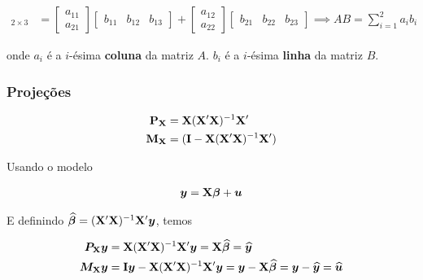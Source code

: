 \documentclass[11pt, oneside, a4paper, article]{article}
\numberwithin{equation}{section}
\begin{document}
\begin{description}
\begin{align*}
	[AB]_{2 \times 3} &=
	\begin{bmatrix}
		a_{11} \\ a_{21}
	\end{bmatrix}
	\begin{bmatrix}
		b_{11} & b_{12} & b_{13}
	\end{bmatrix}
	+
	\begin{bmatrix}
		a_{12} \\ a_{22}
	\end{bmatrix}
	\begin{bmatrix}
		b_{21} & b_{22} & b_{23}
	\end{bmatrix}
	\implies
	AB = \sum_{i=1}^{2} a_{i}b_{i}
\end{align*}

\noindent
onde
$a_{i}$ é a $i$-ésima \textbf{coluna} da matriz $A$.
$b_{i}$ é a $i$-ésima \textbf{linha} da matriz $B$.

\subsubsection{Projeções}

\vspace{-2 em}
\begin{align*}
	\mathbf{P}_{\mathbf{X}} &= \mathbf{X} (\mathbf{X}' \mathbf{X})^{-1} \mathbf{X}'
	\\
	\mathbf{M}_{\mathbf{X}} &= (\mathbf{I} - \mathbf{X} (\mathbf{X}' \mathbf{X})^{-1} \mathbf{X}')
\end{align*}

Usando o modelo

\vspace{-1 em}
\begin{align*}
	\boldsymbol{y} = \mathbf{X} \boldsymbol{\beta} + \boldsymbol{u}
\end{align*}

E definindo $\widehat{\boldsymbol{\beta}} = (\mathbf{X}' \mathbf{X})^{-1} \mathbf{X}' \boldsymbol{y}$, temos

\vspace{-1 em}
\begin{align*}
	\boldsymbol{P}_{\mathbf{X}}\boldsymbol{y}  &= \mathbf{X} (\mathbf{X}' \mathbf{X})^{-1} \mathbf{X}' \boldsymbol{y} = \mathbf{X} \widehat{\boldsymbol{\beta}} = \widehat{\boldsymbol{y}}
	\\
	\boldsymbol{M}_{\mathbf{X}}\boldsymbol{y}  &= \mathbf{I} \boldsymbol{y}  - \mathbf{X} (\mathbf{X}' \mathbf{X})^{-1} \mathbf{X}' \boldsymbol{y} 
	=
	\boldsymbol{y}  - \mathbf{X} \widehat{\boldsymbol{\beta}} 
	=
	\boldsymbol{y} - \widehat{\boldsymbol{y}} = \widehat{\boldsymbol{u}}
\end{align*}



\end{description}
\end{document}
